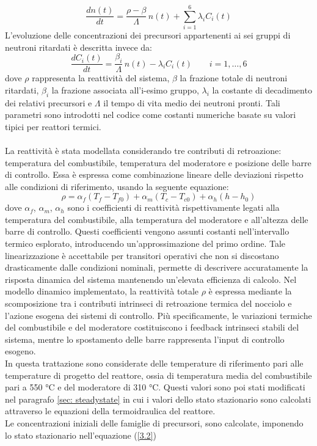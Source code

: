 \documentclass[12pt]{report}
\begin{document}
\begin{equation}
\frac{dn(t)}{dt} = \frac{\rho - \beta}{\Lambda} \, n(t) + \sum_{i=1}^{6} \lambda_i C_i(t)
\label {3.1}
\end{equation}
L’evoluzione delle concentrazioni dei precursori appartenenti ai sei gruppi di neutroni ritardati è descritta invece da:
\begin{equation}
\frac{dC_i(t)}{dt} = \frac{\beta_i}{\Lambda} \, n(t) - \lambda_i C_i(t)
\qquad i = 1, \dots, 6
\label {3.2}
\end{equation}
dove $\rho$  rappresenta la reattività del sistema, $\beta$ la frazione totale di neutroni ritardati, $\beta_i$ la frazione associata all’i-esimo gruppo, $\lambda_i$ la costante di decadimento dei relativi precursori e $\Lambda$ il tempo di vita medio dei neutroni pronti. Tali parametri sono introdotti nel codice come costanti numeriche basate su valori tipici per reattori termici.\\ \\La reattività è stata modellata considerando tre contributi di retroazione: temperatura del combustibile, temperatura del moderatore e posizione delle barre di controllo. Essa è espressa come combinazione lineare delle deviazioni rispetto alle condizioni di riferimento, usando la seguente equazione:
\begin{equation}
\rho = \alpha_f (T_f - T_{f0}) + \alpha_m (T_c - T_{c0}) + \alpha_h (h - h_0)
\end{equation}
dove $\alpha_f$, $\alpha_m$, $\alpha_h$ sono i coefficienti di reattività rispettivamente legati alla temperatura del combustibile, alla temperatura del moderatore e all'altezza delle barre di controllo. Questi coefficienti vengono assunti costanti nell'intervallo termico esplorato, introducendo un'approssimazione del primo ordine. Tale linearizzazione è accettabile per transitori operativi che non si discostano drasticamente dalle condizioni nominali, permette di descrivere accuratamente la risposta dinamica del sistema mantenendo un'elevata efficienza di calcolo. 
Nel modello dinamico implementato, la reattività totale $\rho$ è espressa mediante la scomposizione tra i contributi intrinseci di retroazione termica del nocciolo e l'azione esogena dei sistemi di controllo. Più specificamente, le variazioni termiche del combustibile e del moderatore costituiscono i feedback intrinseci stabili del sistema, mentre lo spostamento delle barre rappresenta l'input di controllo esogeno. \\In questa trattazione sono considerate delle temperature di riferimento pari alle temperature di progetto del reattore, ossia di temperatura media del combustibile pari a 550 °C e del moderatore di 310 °C. Questi valori sono poi stati modificati nel paragrafo \ref{sec: steadystate} in cui i valori dello stato stazionario sono calcolati attraverso le equazioni della termoidraulica del reattore. \\Le concentrazioni iniziali delle famiglie di precursori, sono calcolate, imponendo lo stato stazionario nell'equazione (\ref{3.2})
\end{document}
